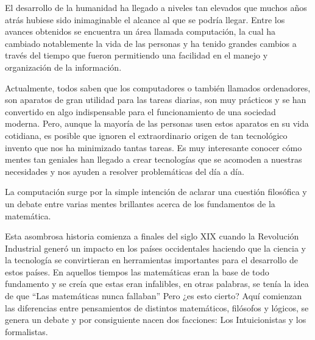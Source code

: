 \documentclass[11pt,letterpaper]{article}
\begin{document}

El desarrollo de la humanidad ha llegado a niveles tan elevados que muchos años atrás hubiese sido inimaginable el alcance al que se podría llegar. Entre los avances obtenidos se encuentra un área llamada computación, la cual ha cambiado notablemente la vida de las personas y ha tenido grandes cambios a través del tiempo que fueron permitiendo una facilidad en el manejo y organización de la información.  
 
\underline{}

Actualmente, todos saben que los computadores o también llamados ordenadores, son aparatos de gran utilidad para las tareas diarias, son muy prácticos y se han convertido en algo indispensable para el funcionamiento de una sociedad moderna. Pero, aunque la mayoría de las personas usen estos aparatos en su vida cotidiana, es posible que ignoren el extraordinario origen de tan tecnológico invento que nos ha minimizado tantas tareas. Es muy interesante conocer cómo mentes tan geniales han llegado a crear tecnologías que se acomoden a nuestras necesidades y nos ayuden a resolver problemáticas del día a día.

\vspace{10PT}




La computación surge por la simple intención de aclarar una cuestión filosófica y un debate entre varias mentes brillantes acerca de los fundamentos de la matemática.

\vspace{10PT}

Esta asombrosa historia comienza a finales del siglo XIX cuando la Revolución Industrial generó un impacto en los países occidentales haciendo que la ciencia y la tecnología se convirtieran en herramientas importantes para el desarrollo de estos países. En aquellos tiempos las matemáticas eran la base de todo fundamento y se creía que estas eran infalibles, en otras palabras, se tenía la idea de que “Las matemáticas nunca fallaban” Pero ¿es esto cierto? Aquí comienzan las diferencias entre pensamientos de distintos matemáticos, filósofos y lógicos, se genera un debate y por consiguiente nacen dos facciones: Los Intuicionistas y los formalistas. 
\end{document}
